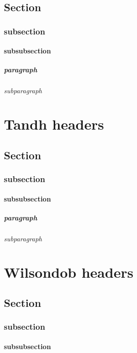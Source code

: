 \documentclass[a4paper, 12pt]{memoir}
\begin{document}
\section*{ Section }
\subsection*{subsection }
\subsubsection*{subsubsection} 
\paragraph*{paragraph} 
\subparagraph*{subparagraph} 

\chapter*{ Tandh headers } 
\section*{ Section }
\subsection*{subsection }
\subsubsection*{subsubsection} 
\paragraph*{paragraph} 
\subparagraph*{subparagraph} 

\chapter*{ Wilsondob headers } 
\section*{ Section }
\subsection*{subsection }
\subsubsection*{subsubsection} 
\end{document}
